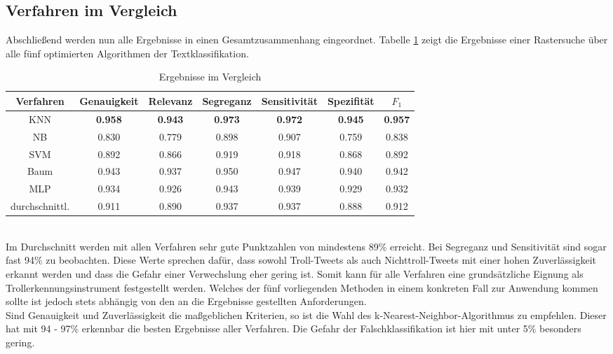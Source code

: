 \subsection{Verfahren im Vergleich}
Abschließend werden nun alle Ergebnisse in einen Gesamtzusammenhang eingeordnet. Tabelle \ref{results-all} zeigt die Ergebnisse einer Rastersuche über alle fünf optimierten Algorithmen der Textklassifikation.  
\begin{table}[htb]
	\begin{center}
		\begin{tabular}{|c|c|c|c|c|c|c|}
			\hline 
			Verfahren & Genauigkeit & Relevanz & Segreganz & Sensitivität & Spezifität & $F_1$ \\ \hline \hline
			KNN      & \textbf{0.958} & \textbf{0.943} & \textbf{0.973} & \textbf{0.972} & \textbf{0.945} & \textbf{0.957} \\ \hline
			NB   & 0.830 & 0.779 & 0.898 & 0.907 & 0.759 & 0.838 \\ \hline 
			SVM & 0.892 & 0.866 & 0.919 & 0.918 & 0.868 & 0.892 \\ \hline 
			Baum   & 0.943 & 0.937 & 0.950 & 0.947 & 0.940 & 0.942 \\ \hline
			MLP   & 0.934 & 0.926 & 0.943 & 0.939 & 0.929 & 0.932 \\ \hline \hline
			durchschnittl. & 0.911 & 0.890 & 0.937 & 0.937 & 0.888 & 0.912 \\ \hline
		\end{tabular}
		\caption{Ergebnisse im Vergleich}\label{results-all}
	\end{center}
\end{table}\\
Im Durchschnitt werden mit allen Verfahren sehr gute Punktzahlen von mindestens 89\% erreicht. Bei Segreganz und Sensitivität sind sogar fast 94\% zu beobachten. Diese Werte sprechen dafür, dass sowohl Troll-Tweets als auch Nichttroll-Tweets mit einer hohen Zuverlässigkeit erkannt werden und dass die Gefahr einer Verwechslung eher gering ist. Somit kann für alle Verfahren eine grundsätzliche Eignung als Trollerkennungsinstrument festgestellt werden. Welches der fünf vorliegenden Methoden in einem konkreten Fall zur Anwendung kommen sollte ist jedoch stets abhängig von den an die Ergebnisse gestellten Anforderungen.\\
Sind Genauigkeit und Zuverlässigkeit die maßgeblichen Kriterien, so ist die Wahl des k-Nearest-Neighbor-Algorithmus zu empfehlen. Dieser hat mit 94 - 97\% erkennbar die besten Ergebnisse aller Verfahren. Die Gefahr der Falschklassifikation ist hier mit unter 5\% besonders gering.\\
